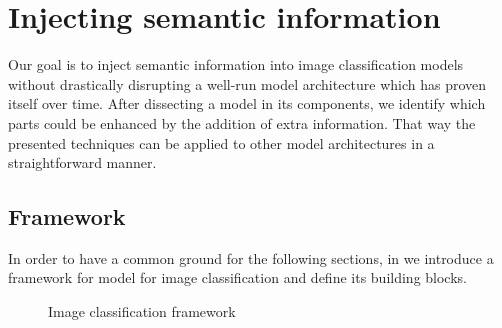 \chapter{Injecting semantic information}
\label{ch:injecting-semantic-information}

Our goal is to inject semantic information into image classification models without drastically disrupting a well-run model architecture which has proven itself over time.
After dissecting a model in its components, we identify which parts could be enhanced by the addition of extra information. That way the presented techniques can be applied to other model architectures in a straightforward manner.

\section{Framework}
\label{sec:framework}

In order to have a common ground for the following sections, in  we introduce a framework for model for image classification and define its building blocks.
\begin{figure}[htbp]
  \caption{Image classification framework}
  \label{fig:03/framework}
\end{figure}

